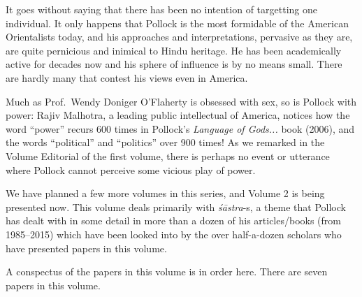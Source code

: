 It goes without saying that there has been no intention of targetting one individual. It only happens that Pollock is the most formidable of the American Orientalists today, and his approaches and interpretations, pervasive as they are, are quite pernicious and inimical to Hindu heritage. He has been academically active for decades now and his sphere of influence is by no means small. There are hardly many that contest his views even in America. 
\eject

Much as Prof.~Wendy Doniger O’Flaherty is obsessed with sex, so is Pollock with power: Rajiv Malhotra, a leading public intellectual of America, notices how the word “power” recurs 600 times in Pollock’s {\sl Language of Gods...} book (2006), and the words “political” and “politics” over 900 times! As we remarked in the Volume Editorial of the first volume, there is perhaps no event or utterance where Pollock cannot perceive some vicious play of power.

We have planned a few more volumes in this series, and Volume 2 is being presented now. This volume deals primarily with {\sl śāstra}-s, a theme that Pollock has dealt with in some detail in more than a dozen of his articles/books (from 1985--2015) which have been looked into by the over half-a-dozen scholars who have presented papers in this volume.
\vskip 8pt

A conspectus of the papers in this volume is in order here. There are seven papers in this volume.

